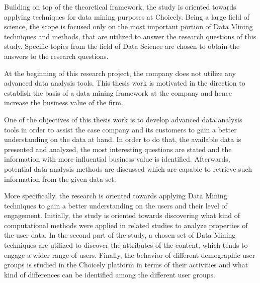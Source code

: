     Building on top of the theoretical framework, the study is oriented towards applying techniques for data mining purposes at Choicely. Being a large field of science, the scope is focused only on the most important portion of Data Mining techniques and methods, that are utilized to answer the research questions of this study. Specific topics from the field of Data Science are chosen to obtain the answers to the research questions. 
    
    At the beginning of this research project, the company does not utilize any advanced data analysis tools. This thesis work is motivated in the direction to establish the basis of a data mining framework at the company and hence increase the business value of the firm.  

    One of the objectives of this thesis work is to develop advanced data analysis tools in order to assist the case company and its customers to gain a better understanding on the data at hand. In order to do that, the available data is presented and analyzed, the most interesting questions are stated and the information with more influential business value is identified. Afterwards, potential data analysis methods are discussed which are capable to retrieve such information from the given data set.  

    More specifically, the research is oriented towards applying Data Mining techniques to gain a better understanding on the users and their level of engagement. Initially, the study is oriented towards discovering what kind of computational methods were applied in related studies to analyze properties of the user data. In the second part of the study, a chosen set of Data Mining techniques are utilized to discover the attributes of the content, which tends to engage a wider range of users. Finally, the behavior of different demographic user groups is studied in the Choicely platform in terms of their activities and what kind of differences can be identified among the different user groups.


